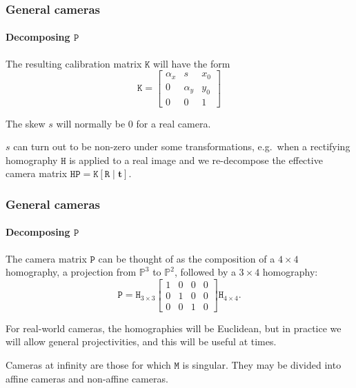 \documentclass[aspectratio=169]{beamer}
\renewcommand{\vec}[1]{\boldsymbol{#1}}
\newcommand{\mat}[1]{\mathtt{#1}}
\def\Pset{\mathbb{P}}
\begin{document}
\begin{frame}
\frametitle{General cameras}
\framesubtitle{Decomposing $\mat{P}$}

The resulting calibration matrix $\mat{K}$ will have the form
\begin{equation*}
\mat{K}=\begin{bmatrix}
\alpha_x & s & x_0 \\ 0 & \alpha_y & y_0 \\ 0 & 0 & 1 \end{bmatrix}
\end{equation*}

\medskip

The \alert{skew} $s$ will normally be 0 for a real camera.

\medskip

$s$ can turn out to be non-zero under some transformations, e.g.\ when
a \alert{rectifying homography} $\mat{H}$ is applied to a real image
and we re-decompose the effective camera matrix $\mat{H}\mat{P} =
\mat{K}[\mat{R} \mid \vec{t}]$.

\end{frame}


\begin{frame}
\frametitle{General cameras}
\framesubtitle{Decomposing $\mat{P}$}

The camera matrix $\mat{P}$ can be thought of as the \alert{composition} of a
$4\times 4$ homography, a projection from $\Pset^3$ to $\Pset^2$,
followed by a $3\times 4$ homography:
\begin{equation*}
\mat{P} = \mat{H}_{3\times 3} \begin{bmatrix} 1 & 0 & 0 & 0 \\ 0 & 1 &
0 & 0 \\ 0 & 0 & 1 & 0 \end{bmatrix} \mat{H}_{4\times 4}.
\end{equation*}

\medskip

For \alert{real-world} cameras, the homographies will be
\alert{Euclidean}, but in practice we will allow general
projectivities, and this will be useful at times.

\medskip

Cameras at infinity are those for which $\mat{M}$ is singular.  They
may be divided into \alert{affine} cameras and \alert{non-affine}
cameras.

\end{frame}
\end{document}
